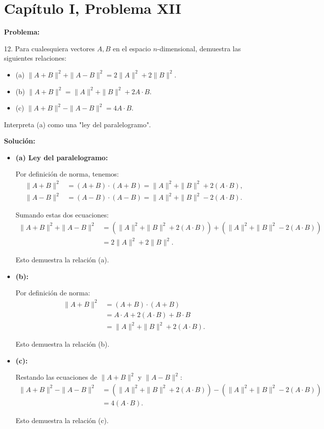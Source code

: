 \section*{Capítulo I, Problema XII}

\textbf{Problema:}

12. Para cualesquiera vectores $A, B$ en el espacio $n$-dimensional, demuestra las siguientes relaciones:
\begin{itemize}
    \item (a) $\|A + B\|^2 + \|A - B\|^2 = 2\|A\|^2 + 2\|B\|^2$.
    \item (b) $\|A + B\|^2 = \|A\|^2 + \|B\|^2 + 2A \cdot B$.
    \item (c) $\|A + B\|^2 - \|A - B\|^2 = 4A \cdot B$.
\end{itemize}

Interpreta (a) como una "ley del paralelogramo".

\textbf{Solución:}

\begin{itemize}
    \item \textbf{(a) Ley del paralelogramo:}

    Por definición de norma, tenemos:
    \begin{align*}
        \|A + B\|^2 &= (A + B) \cdot (A + B) = \|A\|^2 + \|B\|^2 + 2(A \cdot B), \\
        \|A - B\|^2 &= (A - B) \cdot (A - B) = \|A\|^2 + \|B\|^2 - 2(A \cdot B).
    \end{align*}

    Sumando estas dos ecuaciones:
    \begin{align*}
        \|A + B\|^2 + \|A - B\|^2 &= \left(\|A\|^2 + \|B\|^2 + 2(A \cdot B)\right) + \left(\|A\|^2 + \|B\|^2 - 2(A \cdot B)\right) \\
        &= 2\|A\|^2 + 2\|B\|^2.
    \end{align*}

    Esto demuestra la relación (a).

    \item \textbf{(b):}

    Por definición de norma:
    \begin{align*}
        \|A + B\|^2 &= (A + B) \cdot (A + B) \\
        &= A \cdot A + 2(A \cdot B) + B \cdot B \\
        &= \|A\|^2 + \|B\|^2 + 2(A \cdot B).
    \end{align*}

    Esto demuestra la relación (b).

    \item \textbf{(c):}

    Restando las ecuaciones de $\|A + B\|^2$ y $\|A - B\|^2$:
    \begin{align*}
        \|A + B\|^2 - \|A - B\|^2 &= \left(\|A\|^2 + \|B\|^2 + 2(A \cdot B)\right) - \left(\|A\|^2 + \|B\|^2 - 2(A \cdot B)\right) \\
        &= 4(A \cdot B).
    \end{align*}

    Esto demuestra la relación (c).
\end{itemize}